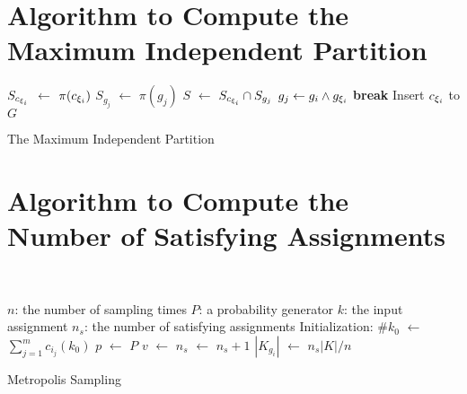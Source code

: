 
\section{Algorithm to Compute the Maximum Independent Partition}
\label{appendix:partition}

{\small
\IncMargin{1em}
\begin{algorithm}[h]
    \DontPrintSemicolon
    {
        $S_{c_{{\xi}_{i}}}$ $\leftarrow$ $\pi(c_{{\xi}_{i}})$ \;
        {
            $S_{g_j}$ $\leftarrow$ $\pi(g_{j})$ \;
            $S$ $\leftarrow$ $S_{c_{{\xi}_{i}}} \cap S_{g_j}$  \;
            {
                $g_{j} \leftarrow g_{i} \land g_{{\xi}_{i}}$ \;
                \textbf{break} \;
            }
            Insert $c_{{\xi}_{i}}$ to $G$
        }
    }
    \caption{The Maximum Independent Partition}
    \label{algo:max-inde}
\end{algorithm}
\DecMargin{1em}
}

\newpage
\section{Algorithm to Compute the Number of Satisfying Assignments}
\label{appendix:montecarlo}
~
{\small
\IncMargin{1em}
\begin{algorithm}
    \SetAlgoLined
    \DontPrintSemicolon


    $n$: the number of sampling times \;
    $P$: a probability generator \;
    $k$: the input assignment \;
    $n_{s}$: the number of satisfying assignments \;
    Initialization: \;
    $\#{k_0}$ $\leftarrow$ $\sum_{j=1}^{m}c_{i_j}(k_0)$ \;
     {
        $p$ $\leftarrow$ $P$ \;
        {
            $v$ $\leftarrow$  {}
        }
        {$n_{s}$ $\leftarrow$ $n_{s} + 1$}
    }
    $|K_{g_{i}}|$ $\leftarrow$ $n_s|K| / n$
    \caption{Metropolis Sampling}
\end{algorithm}
\DecMargin{1em}
}


